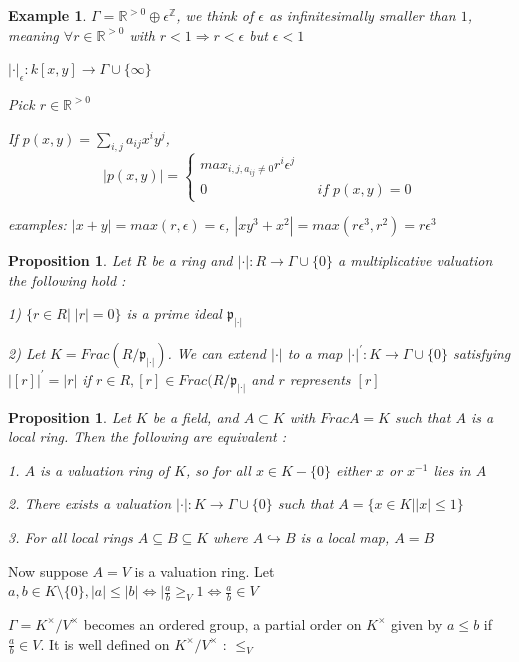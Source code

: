 \documentclass{article}
\newtheorem{example}[theorem]{Example}
\newtheorem{proposition}[theorem]{Proposition}
\begin{document}
\begin{example}
    $\Gamma=\mathbb R^{>0}\oplus \epsilon^{\mathbb Z}$, we think of $\epsilon$ as infinitesimally smaller than $1$, meaning $\forall r\in\mathbb R^{>0}$ with $r<1\Rightarrow r<\epsilon$ but $\epsilon<1$

    $|\cdot|_ \epsilon: k[x,y]\to \Gamma\cup\{\infty\}$
    
    Pick $r\in\mathbb R^{>0}$

    If $p(x,y)=\sum_{i,j}a_{ij}x^iy^j$,
$$ 
|p(x,y)|=\left\{
\begin{array}{rcl}
max_{i,j,a_{ij}\ne0}r^i\epsilon^j       &      & \\
0     &      & if\;p(x,y)=0
\end{array} \right. $$

examples:
    $|x+y|= max(r,\epsilon)= \epsilon$, $|xy^3+x^2|= max(r\epsilon^3,r^2)= r\epsilon^3$
\end{example}

\begin{proposition}
    Let $R$ be a ring and $|\cdot|: R\to \Gamma\cup\{0\}$ a  multiplicative valuation the following hold :

    1) $\{r\in R|\;|r|=0\}$ is a prime ideal $\mathfrak p_{|\cdot|}$

    2) Let $K=Frac(R/\mathfrak p_{|\cdot|})$. We can extend $|\cdot|$ to a map $|\cdot|^\prime: K\to \Gamma\cup\{0\}$ satisfying $|[r]|^\prime = |r|$ if $r\in R,[r]\in Frac(R/\mathfrak p_{|\cdot|}$ and $r$ represents $[r]$
\end{proposition}

\begin{proposition}
    Let $K$ be a field, and $A \subset K$ with $Frac A = K$ such that $A$ is a local ring. Then the
following are equivalent :

1. $A$ is a valuation ring of $K$, so for all $x \in K-\{0\}$ either $x$ or $x^{-1}$ lies in $A$

2. There exists a valuation $|\cdot| : K \to \Gamma \cup \{0\}$ such that $A=\{x \in K | |x| \leq 1\}$

3. For all local rings $A \subseteq B \subseteq K$ where $A \hookrightarrow B$ is a local map, $A = B$
\end{proposition}

Now suppose $A=V$ is a valuation ring. Let $a,b\in K\setminus\{0\},|a|\leq|b|\Leftrightarrow |\frac{a}{b}\geq_V 1 \Leftrightarrow \frac{a}{b}\in V$

$\Gamma=K^\times/V^\times$ becomes an ordered group, a partial order on $K^\times$ given by $a\leq b$ if $\frac{a}{b}\in V$. It is well defined on $K^\times/V^\times$ : $\leq_V$
\end{document}
